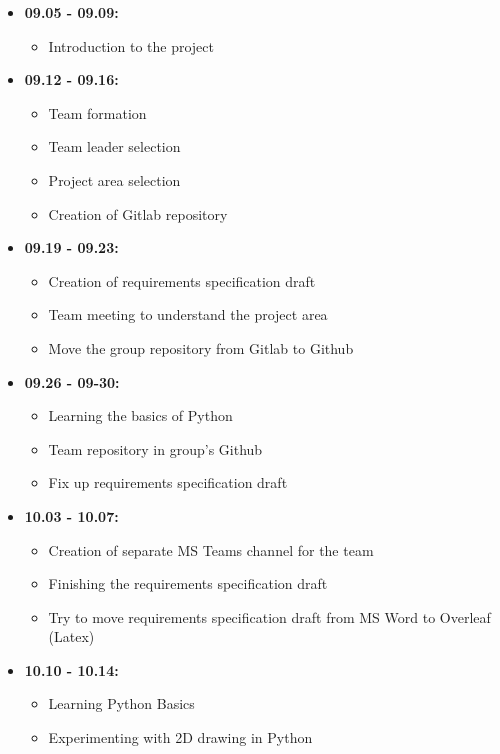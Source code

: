 \documentclass[a4paper,12pt,fleqn]{article}
\begin{document}
\begin{itemize}
    \item \textbf{09.05 - 09.09:}
    \begin{itemize}
        \item Introduction to the project
    \end{itemize}
    
    \item \textbf{09.12 - 09.16:}
    \begin{itemize}
        \item Team formation
        \item Team leader selection
        \item Project area selection
        \item Creation of Gitlab repository
    \end{itemize}
    
    \item \textbf{09.19 - 09.23:}
    \begin{itemize}
        \item Creation of requirements specification draft
        \item Team meeting to understand the project area
        \item Move the group repository from Gitlab to Github
    \end{itemize}
    
    \item \textbf{09.26 - 09-30:}
    \begin{itemize}
        \item Learning the basics of Python
        \item Team repository in group's Github
        \item Fix up requirements specification draft
    \end{itemize}
    
    \item \textbf{10.03 - 10.07:}
    \begin{itemize}
        \item Creation of separate MS Teams channel for the team
        \item Finishing the requirements specification draft
        \item Try to move requirements specification draft from MS Word to Overleaf (Latex)
    \end{itemize}
    
    \item \textbf{10.10 - 10.14:}
    \begin{itemize}
        \item Learning Python Basics
        \item Experimenting with 2D drawing in Python
    \end{itemize}
    

\end{itemize}
\end{document}
